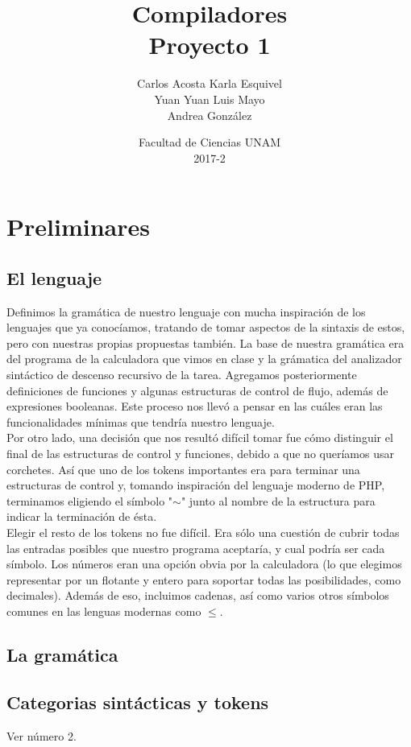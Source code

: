 \documentclass[12pt]{article}
\title{Compiladores\\ Proyecto 1}
\author{Carlos Acosta \qquad Karla Esquivel \\ Yuan Yuan \qquad Luis Mayo \\ Andrea González}
\date{Facultad de Ciencias UNAM \\ 2017-2}
\begin{document}
\maketitle
\tableofcontents
\newpage

\section{Preliminares}
\subsection{El lenguaje}
Definimos la gramática de nuestro lenguaje con mucha inspiración de los lenguajes que ya conocíamos, tratando de tomar aspectos de la sintaxis de estos, pero con nuestras propias propuestas también. La base de nuestra gramática era del programa de la calculadora que vimos en clase y la grámatica del analizador sintáctico de descenso recursivo de la tarea. Agregamos posteriormente definiciones de funciones y algunas estructuras de control de flujo, además de expresiones booleanas. Este proceso nos llevó a pensar en las cuáles eran las funcionalidades mínimas que tendría nuestro lenguaje. \\

Por otro lado, una decisión que nos resultó difícil tomar fue cómo distinguir el final de las estructuras de control y funciones, debido a que no queríamos usar corchetes. Así que uno de los tokens importantes era para terminar una estructuras de control y, tomando inspiración del lenguaje moderno de PHP, terminamos eligiendo el símbolo "$\sim$" junto al nombre de la estructura para indicar la terminación de ésta. \\

Elegir el resto de los tokens no fue difícil. Era sólo una cuestión de cubrir todas las entradas posibles que nuestro programa aceptaría, y cual podría ser cada símbolo. Los números eran una opción obvia por la calculadora (lo que elegimos representar por un flotante y entero para soportar todas las posibilidades, como decimales). Además de eso, incluimos cadenas, así como varios otros símbolos comunes en las lenguas modernas como $\leq$.

\subsection {La gramática}
\subsection{Categorias sintácticas y tokens}
Ver número 2.
\end{document}
